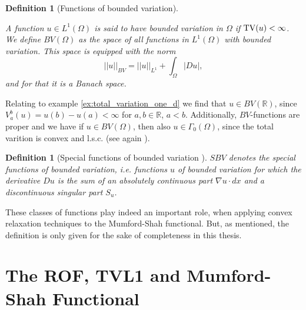 \documentclass{scrreprt}
\newtheorem{definition}[theorem]{Definition}
\begin{document}
        \begin{definition}[Functions of bounded variation]
        \label{def:functions_of_bounded_variation}

            A function $u \in L^{1}(\Omega)$ is said to have bounded variation in $\Omega$ if $\textnormal{TV}(u) < \infty$. We define $BV(\Omega)$ as the space of all functions in $L^{1}(\Omega)$ with bounded variation. This space is equipped with the norm
                $$
                    ||u||_{BV} = ||u||_{L^{1}} + \int_{\Omega} |Du|,
                $$
            and for that it is a Banach space.
        
        \end{definition}

        Relating to example \ref{ex:total_variation_one_d} we find that $u \in BV(\mathbb{R})$, since $V^{b}_{a}(u) = u(b) - u(a) < \infty$ for $a, b \in \mathbb{R}$, $a < b$.
        Additionally, $BV$-functions are proper and we have if $u \in BV(\Omega)$, then also $u \in \Gamma_{0}(\Omega)$, since the total varition is convex and l.s.c. (see again \cite{Chambolle-et-al-10}).

        \begin{definition}[Special functions of bounded variation \cite{Pock-et-al-iccv09}]
            $SBV$ denotes the special functions of bounded variation, i.e. functions $u$ of bounded variation for which the derivative $Du$ is the sum of an absolutely continuous part $\nabla u \cdot dx$ and a discontinuous singular part $S_{u}$.
        \end{definition}

        These classes of functions play indeed an important role, when applying convex relaxation techniques to the Mumford-Shah functional. But, as mentioned, the definition is only given for the sake of completeness in this thesis.



\chapter{The ROF, TVL1 and Mumford-Shah Functional} %
\label{cha:the_rof_tvl1_and_mumford_shah_functional}
\end{document}
